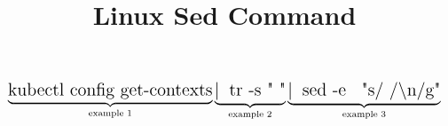 \documentclass[12pt]{article}
\title{Linux Sed Command}
\begin{document}
	\[
	\Large{\underbrace{\text{kubectl config get-contexts}}_\text{example 1} \underbrace{\text{\textbar \: tr -s " "}}_\text{example 2} \underbrace{\text{\textbar \: sed -e \: "s/ /\textbackslash n/g"}}_\text{example 3}}
	\]
\end{document}
